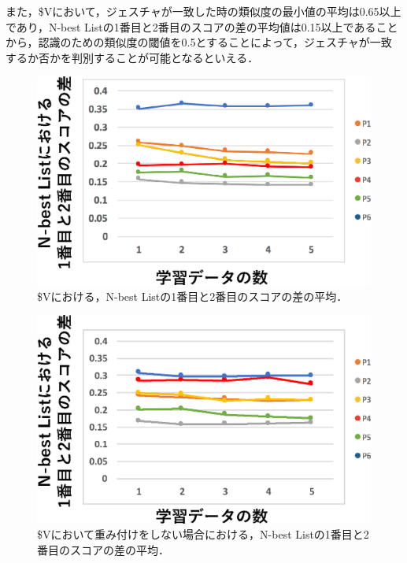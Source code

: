 また，\$Vにおいて，ジェスチャが一致した時の類似度の最小値の平均は0.65以上であり，N-best Listの1番目と2番目のスコアの差の平均値は0.15以上であることから，認識のための類似度の閾値を0.5とすることによって，ジェスチャが一致するか否かを判別することが可能となるといえる．
\begin{figure}[!h]
\centering
\includegraphics[width=0.7\columnwidth]{img/rec_diff.eps}
\caption{\$Vにおける，N-best Listの1番目と2番目のスコアの差の平均．}
\label{fig:rec_diff}
\end{figure}

\begin{figure}[!h]
\centering
\includegraphics[width=0.7\columnwidth]{img/rec_diff_10.eps}
\caption{\$Vにおいて重み付けをしない場合における，N-best Listの1番目と2番目のスコアの差の平均．}
\label{fig:rec_diff_10}
\end{figure}

